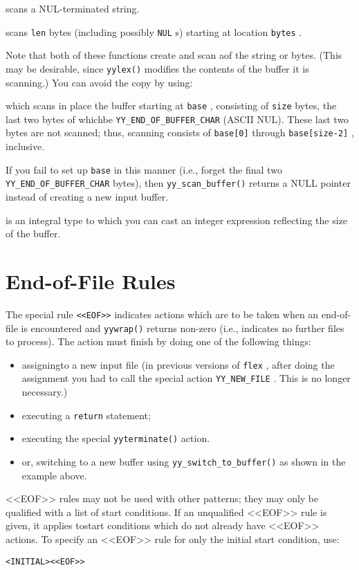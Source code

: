 \documentclass[openany,oneside]{book}
\begin{document}
scans a NUL-terminated string.

scans \verb`len` bytes (including possibly \verb`NUL` s) starting at location \verb`bytes` .

Note that both of these functions create and scan aof the
string or bytes.  (This may be desirable, since \verb`yylex()` modifies
the contents of the buffer it is scanning.)  You can avoid the copy by
using:



which scans in place the buffer starting at \verb`base` , consisting of \verb`size` bytes, the last two bytes of whichbe \verb`YY_END_OF_BUFFER_CHAR` (ASCII NUL).  These last two bytes are not
scanned; thus, scanning consists of \verb`base[0]` through \verb`base[size-2]` , inclusive.

If you fail to set up \verb`base` in this manner (i.e., forget the final
two \verb`YY_END_OF_BUFFER_CHAR` bytes), then \verb`yy_scan_buffer()` returns a NULL pointer instead of creating a new input buffer.

is an integral type to which you can cast an integer expression
reflecting the size of the buffer.
\chapter{End-of-File Rules}


The special rule \verb`<<EOF>>` indicates
actions which are to be taken when an end-of-file is
encountered and \verb`yywrap()` returns non-zero (i.e., indicates
no further files to process).  The action must finish
by doing one of the following things:
\begin{itemize}
\item assigningto a new input file (in previous versions of \verb`flex` , after doing the assignment you had to call the special
action \verb`YY_NEW_FILE` .  This is no longer necessary.)
\item executing a \verb`return` statement;
\item executing the special \verb`yyterminate()` action.
\item or, switching to a new buffer using \verb`yy_switch_to_buffer()` as
shown in the example above.
\end{itemize}


<<EOF>> rules may not be used with other patterns; they may only be
qualified with a list of start conditions.  If an unqualified <<EOF>>
rule is given, it applies tostart conditions which do not
already have <<EOF>> actions.  To specify an <<EOF>> rule for only the
initial start condition, use:
\begin{verbatim}
<INITIAL><<EOF>>
\end{verbatim}
\end{document}
